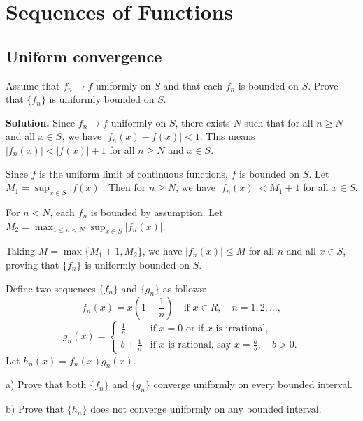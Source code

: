 \chapter{Sequences of Functions}

\section{Uniform convergence}

\begin{problembox}
Assume that \( f_n \to f \) uniformly on \( S \) and that each \( f_n \) is bounded on \( S \). Prove that \(\{f_n\}\) is uniformly bounded on \( S \).
\end{problembox}

\noindent\textbf{Solution.} Since \( f_n \to f \) uniformly on \( S \), there exists \( N \) such that for all \( n \geq N \) and all \( x \in S \), we have \( |f_n(x) - f(x)| < 1 \). This means \( |f_n(x)| < |f(x)| + 1 \) for all \( n \geq N \) and \( x \in S \).

Since \( f \) is the uniform limit of continuous functions, \( f \) is bounded on \( S \). Let \( M_1 = \sup_{x \in S} |f(x)| \). Then for \( n \geq N \), we have \( |f_n(x)| < M_1 + 1 \) for all \( x \in S \).

For \( n < N \), each \( f_n \) is bounded by assumption. Let \( M_2 = \max_{1 \leq n < N} \sup_{x \in S} |f_n(x)| \).

Taking \( M = \max\{M_1 + 1, M_2\} \), we have \( |f_n(x)| \leq M \) for all \( n \) and all \( x \in S \), proving that \(\{f_n\}\) is uniformly bounded on \( S \).

\begin{problembox}
Define two sequences \(\{f_n\}\) and \(\{g_n\}\) as follows:
\[f_n(x) = x \left( 1 + \frac{1}{n} \right) \quad \text{if } x \in R, \quad n = 1, 2, \ldots,\]
\[g_n(x) = 
\begin{cases}
\frac{1}{n} & \text{if } x = 0 \text{ or if } x \text{ is irrational,} \\
b + \frac{1}{n} & \text{if } x \text{ is rational, say } x = \frac{a}{b}, \quad b > 0.
\end{cases}\]
Let \( h_n(x) = f_n(x) g_n(x) \).

a) Prove that both \(\{f_n\}\) and \(\{g_n\}\) converge uniformly on every bounded interval.

b) Prove that \(\{h_n\}\) does not converge uniformly on any bounded interval.
\end{problembox}

